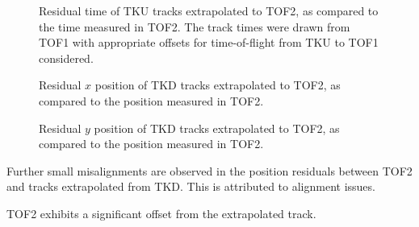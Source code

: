 \begin{figure}[!tbh]
    \centering
    {Residual time of TKU tracks extrapolated to TOF2, as compared to the time measured in TOF2. The track times were
    drawn from TOF1 with appropriate offsets for time-of-flight from TKU to TOF1 considered.}
\end{figure}

\begin{figure}[!tbh]
    \centering
    {Residual $x$ position of TKD tracks extrapolated to TOF2, as compared to the position measured in TOF2.}
\end{figure}

\begin{figure}[!tbh]
    \centering
    {Residual $y$ position of TKD tracks extrapolated to TOF2, as compared to the position measured in TOF2.}
\end{figure}

Further small misalignments are observed in the position residuals between TOF2
and tracks extrapolated from TKD. This is attributed to alignment issues.

TOF2 exhibits a significant offset from the extrapolated track.

